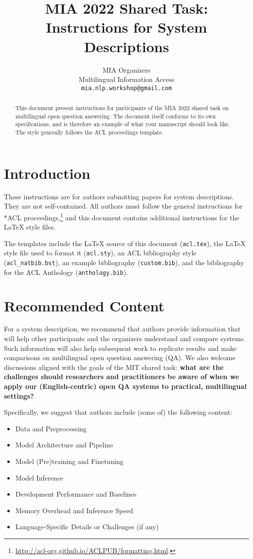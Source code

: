 \documentclass[11pt]{article}
\title{MIA 2022 Shared Task: Instructions for System Descriptions}
\author{MIA Organizers \\
   Multilingual Information Access\\
  \texttt{mia.nlp.workshop@gmail.com}
  }
\begin{document}
\maketitle
\begin{abstract}
This document present instructions for participants of the MIA 2022 shared task on multilingual open question answering.
The document itself conforms to its own specifications, and is therefore an example of what your manuscript should look like.
The style generally follows the ACL proceedings template.
\end{abstract}

\section{Introduction}

These instructions are for authors submitting papers for system descriptions. They are not self-contained. All authors must follow the general instructions for *ACL proceedings,\footnote{\url{http://acl-org.github.io/ACLPUB/formatting.html}.} and this document contains additional instructions for the \LaTeX{} style files.

The templates include the \LaTeX{} source of this document (\texttt{acl.tex}),
the \LaTeX{} style file used to format it (\texttt{acl.sty}),
an ACL bibliography style (\texttt{acl\_natbib.bst}),
an example bibliography (\texttt{custom.bib}),
and the bibliography for the ACL Anthology (\texttt{anthology.bib}).

\section{Recommended Content}
For a system description, we recommend that authors provide information that will help other participants and the organizers understand and compare systems.
Such information will also help subsequent work to replicate results and make comparisons on multilingual open question answering (QA).
We also welcome discussions aligned with the goals of the MIT shared task: \textbf{what are the challenges should researchers and practitioners be aware of when we apply our (English-centric) open QA systems to practical, multilingual settings?}


Specifically, we suggest that authors include (some of) the following content:

\begin{itemize}
\item Data and Preprocessing
\item  Model Architecture and Pipeline
\item  Model (Pre)training and Finetuning
\item Model Inference
\item Development Performance and Baselines
\item Memory Overhead and Inference Speed
\item Language-Specific Details or Challenges (if any)
\end{itemize}
\end{document}
